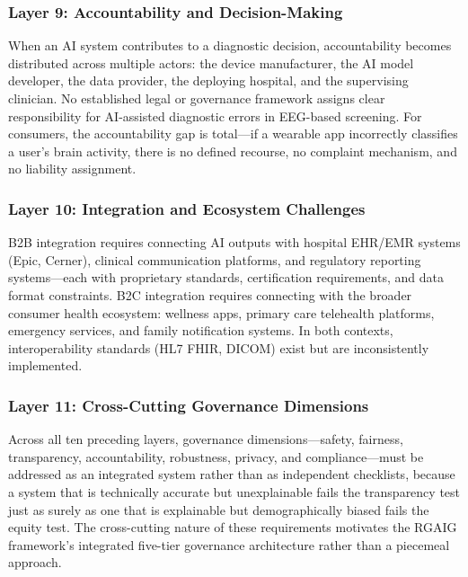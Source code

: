 \subsubsection{Layer 9: Accountability and Decision-Making}

When an AI system contributes to a diagnostic decision, accountability becomes distributed across multiple actors: the device manufacturer, the AI model developer, the data provider, the deploying hospital, and the supervising clinician. No established legal or governance framework assigns clear responsibility for AI-assisted diagnostic errors in EEG-based screening. For consumers, the accountability gap is total---if a wearable app incorrectly classifies a user's brain activity, there is no defined recourse, no complaint mechanism, and no liability assignment.

\subsubsection{Layer 10: Integration and Ecosystem Challenges}

B2B integration requires connecting AI outputs with hospital EHR/EMR systems (Epic, Cerner), clinical communication platforms, and regulatory reporting systems---each with proprietary standards, certification requirements, and data format constraints. B2C integration requires connecting with the broader consumer health ecosystem: wellness apps, primary care telehealth platforms, emergency services, and family notification systems. In both contexts, interoperability standards (HL7 FHIR, DICOM) exist but are inconsistently implemented.

\subsubsection{Layer 11: Cross-Cutting Governance Dimensions}

Across all ten preceding layers, governance dimensions---safety, fairness, transparency, accountability, robustness, privacy, and compliance---must be addressed as an integrated system rather than as independent checklists, because a system that is technically accurate but unexplainable fails the transparency test just as surely as one that is explainable but demographically biased fails the equity test. The cross-cutting nature of these requirements motivates the RGAIG framework's integrated five-tier governance architecture rather than a piecemeal approach.
\fi %

